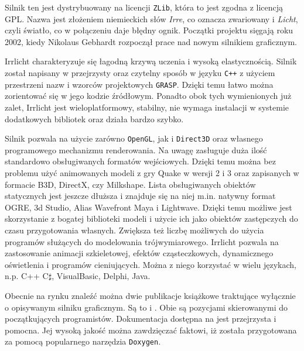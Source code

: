 \documentclass[11pt]{mwrep}
\begin{document}
      Silnik ten jest dystrybuowany na licencji \texttt{ZLib}, która to jest zgodna z licencją GPL. Nazwa jest złożeniem niemieckich słów \textit{Irre}, co oznacza zwariowany i \textit{Licht}, czyli światło, co w połączeniu daje błędny ognik. Początki projektu sięgają roku 2002, kiedy Nikolaus Gebhardt rozpoczął prace nad nowym silnikiem graficznym.

      Irrlicht charakteryzuje się łagodną krzywą uczenia i wysoką elastycznością. Silnik został napisany w przejrzysty oraz czytelny sposób w języku \texttt{C++} z użyciem przestrzeni nazw i wzorców projektowych \texttt{GRASP}. Dzięki temu łatwo można zorientować się w jego kodzie źródłowym. Ponadto obok tych wymienionych już zalet, Irrlicht jest wieloplatformowy, stabilny, nie wymaga instalacji w systemie dodatkowych bibliotek oraz działa bardzo szybko. 

      Silnik pozwala na użycie zarówno \texttt{OpenGL}, jak i \texttt{Direct3D} oraz własnego programowego mechanizmu renderowania. Na uwagę zasługuje duża ilość standardowo obsługiwanych formatów wejściowych. Dzięki temu można bez problemu użyć animowanych modeli z gry Quake w wersji 2 i 3 oraz zapisanych w formacie B3D, DirectX, czy Milkshape. Lista obsługiwanych obiektów statycznych jest jeszcze dłuższa i znajduje się na niej m.in. natywny format OGRE, 3d Studio, Alias Wavefront Maya i Lightwave. Dzięki temu możliwe jest skorzystanie z bogatej biblioteki modeli i użycie ich jako obiektów zastępczych do czasu przygotowania własnych. Zwiększa też liczbę możliwych do użycia programów służących do modelowania trójwymiarowego. Irrlicht pozwala na zastosowanie animacji szkieletowej, efektów cząsteczkowych, dynamicznego oświetlenia i programów cieniujących. Można z niego korzystać w wielu językach, n.p. C++ C$\sharp$, VisualBasic, Delphi, Java.

       Obecnie na rynku znaleźć można dwie publikacje książkowe traktujące wyłącznie o opisywanym silniku graficznym. Są to \cite{irrlichtb1} i \cite{irrlichtb2}. Obie są pozycjami skierowanymi do początkujących programistów. Dokumentacja dostępna na \cite{irrlichtw} jest przejrzysta i pomocna. Jej wysoką jakość można zawdzięczać faktowi, iż została przygotowana za pomocą popularnego narzędzia \texttt{Doxygen}.
\end{document}
